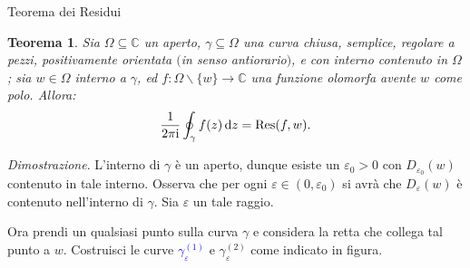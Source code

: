 \documentclass[11pt]{book}
\makeatletter
\theoremstyle{Definizione}
\theoremstyle{TeoremaProposizioneLemmaCorollarioCongettura}
\newtheorem{myteo}{Teorema}[section]
\theoremstyle{OsservazioneNotaEsempio}
\renewenvironment{proof}[1][\proofname]{\par
  \normalfont \topsep6\p@\@plus6\p@\relax
  \trivlist
  \item[\hskip\labelsep
        \itshape
    #1\@addpunct{.}]\ignorespaces
}{%
  \endtrivlist\@endpefalse
}
\renewenvironment{proof}{\textsl{Dimostrazione}.}{}
\newcommand{\C}{\mathbb{C}}
\newcommand{\Disc}[3][]{D^{#1}_{{#2}}({#3})}
\newcommand{\tolto}{\smallsetminus}
\renewcommand{\i}{\textup{i}}
\renewcommand{\d}{\mathrm{d}}
\newcommand{\dz}{\,\d z}
\newcommand{\Res}{\textup{Res}}
\newcommand{\frecciaIn}{
\tikz \draw[-latex] (-1pt,0) -- (1pt,0);
}
\newcommand{\frecciaOut}{
\tikz \draw[latex-] (-1pt,0) -- (1pt,0);
}
\makeatother
\begin{document}
\begin{boxteo}{Teorema dei Residui}
\begin{myteo}\label{teo:TeoremaDeiResidui}
Sia $\Omega \subseteq \C$ un aperto, $\gamma \subseteq \Omega$ una curva chiusa, semplice, regolare a pezzi, positivamente orientata $($in senso antiorario$)$, e con interno contenuto in $\Omega$; sia $w\in \Omega$ interno a $\gamma$, ed $f:\Omega\tolto \{w\} \longrightarrow \C$ una funzione olomorfa avente $w$ come polo. Allora:
$$
\frac{1}{2\pi\i}\oint_{\gamma} f(z)\dz = \Res(f,w).
$$
\end{myteo}
\tcblower
\begin{proof}
L'interno di $\gamma$ è un aperto, dunque esiste un $\varepsilon_0 > 0$ con $\Disc{\varepsilon_0}{w}$ contenuto in tale interno. Osserva che per ogni $\varepsilon\in (0,\varepsilon_0)$ si avrà che $\Disc{\varepsilon}{w}$ è contenuto nell'interno di $\gamma$. Sia $\varepsilon$ un tale raggio. 
\begin{center}
\end{center}
Ora prendi un qualsiasi punto sulla curva $\gamma$ e considera la retta che collega tal punto a $w$. Costruisci le curve \textcolor{blue}{$\gamma_{\varepsilon}^{(1)}$} e \textcolor{green!70!black}{$\gamma_{\varepsilon}^{(2)}$} come indicato in figura.

\end{proof}
\end{boxteo}
\end{document}
